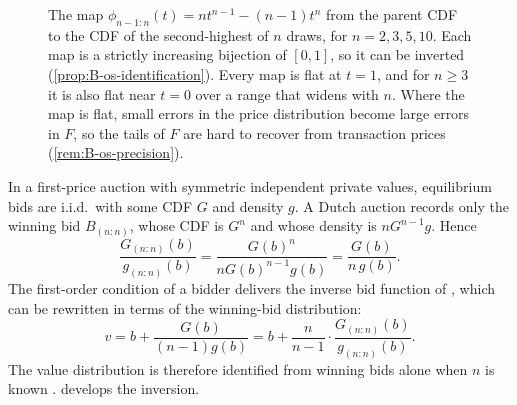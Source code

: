 \begin{figure}[htbp]
  \centering
  \caption{The map $\phi_{n-1:n}(t) = nt^{n-1} - (n-1)t^n$ from the parent CDF to the CDF of the
  second-highest of $n$ draws, for $n = 2, 3, 5, 10$. Each map is a strictly increasing bijection of
  $[0,1]$, so it can be inverted (\cref{prop:B-os-identification}). Every map is flat at $t = 1$, and for $n
  \geq 3$ it is also flat near $t = 0$ over a range that widens with $n$. Where the map is flat, small errors
  in the price distribution become large errors in $F$, so the tails of $F$ are hard to recover from
  transaction prices (\cref{rem:B-os-precision}).}
  \label{fig:B-ordermap}
\end{figure}

\begin{example}\label{ex:B-os-winning-bid}
In a first-price auction with symmetric independent private values, equilibrium bids are i.i.d.\ with some
CDF $G$ and density $g$. A Dutch auction records only the winning bid $B_{(n:n)}$, whose CDF is $G^n$ and
whose density is $nG^{n-1}g$. Hence
\begin{equation*}
  \frac{G_{(n:n)}(b)}{g_{(n:n)}(b)} = \frac{G(b)^n}{nG(b)^{n-1}g(b)} = \frac{G(b)}{n\,g(b)}.
\end{equation*}
The first-order condition of a bidder delivers the inverse bid function of \citet{GuerrePerrigneVuong2000},
which can be rewritten in terms of the winning-bid distribution:
\begin{equation*}
  v = b + \frac{G(b)}{(n-1)g(b)} = b + \frac{n}{n-1}\cdot\frac{G_{(n:n)}(b)}{g_{(n:n)}(b)}.
\end{equation*}
The value distribution is therefore identified from winning bids alone when $n$ is known
\citep[Section~3.3.1, eq.~(3.7)]{AtheyHaile2007}.  develops the inversion.
\end{example}


